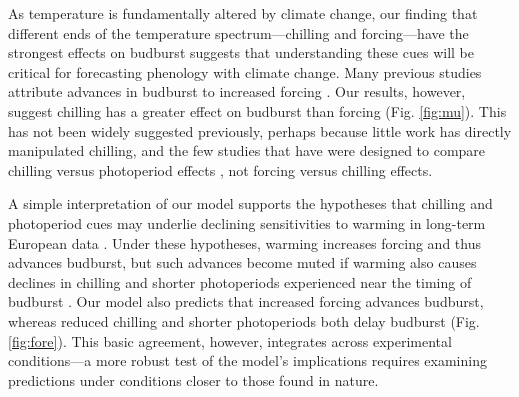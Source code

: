 \documentclass{article}
\begin{document}
\par As temperature is fundamentally altered by climate change, our finding that different ends of the temperature spectrum---chilling and forcing---have the strongest effects on budburst suggests that understanding these cues will be critical for forecasting phenology with climate change. Many previous studies attribute advances in budburst to increased forcing \citep{Basler:2014aa,bradley1999,menzel2006,harrington2015}. %
Our results, however, suggest chilling has a greater effect on budburst than forcing (Fig. \ref{fig:mu}). This has not been widely suggested previously, perhaps because little work has directly manipulated chilling, and the few studies that have were designed to compare chilling versus photoperiod effects \citep[e.g., ][]{Basler:2014aa,Caffarra:2011qf,Laube:2014a,zohner2016}, not forcing versus chilling effects. 

\par A simple interpretation of our model supports the hypotheses that chilling and photoperiod cues may underlie declining sensitivities to warming in long-term European data \citep{Rutishauser:2008,yu2010,fu2015}. Under these hypotheses, warming increases forcing and thus advances budburst, but such advances become muted if warming also causes declines in chilling and shorter photoperiods experienced near the timing of budburst %
\citep{koerner2010a}. Our model also predicts that increased forcing advances budburst, whereas reduced chilling and shorter photoperiods both delay budburst (Fig. \ref{fig:fore}). This basic agreement, however, integrates across experimental conditions---a more robust test of the model's implications requires examining predictions under conditions closer to those found in nature.
\end{document}
